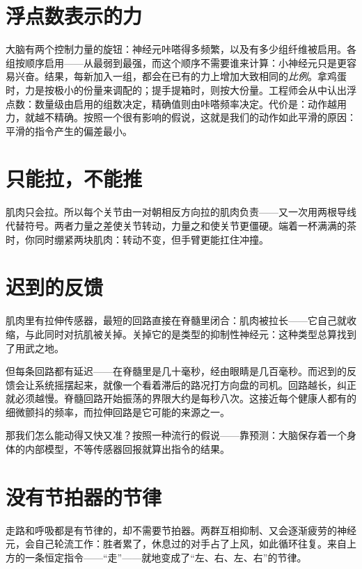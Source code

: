 \section*{浮点数表示的力}

大脑有两个控制力量的旋钮：神经元咔嗒得多频繁，以及有多少组纤维被启用。各组按顺序启用——从最弱到最强，而这个顺序不需要谁来计算：小神经元只是更容易兴奋。结果，每新加入一组，都会在已有的力上增加大致相同的\emph{比例}。拿鸡蛋时，力是按极小的份量来调配的；提手提箱时，则按大份量。工程师会从中认出浮点数：数量级由启用的组数决定，精确值则由咔嗒频率决定。代价是：动作越用力，就越不精确。按照一个很有影响的假说，这就是我们的动作如此平滑的原因：平滑的指令产生的偏差最小。

\section*{只能拉，不能推}

肌肉只会拉。所以每个关节由一对朝相反方向拉的肌肉负责——又一次用两根导线代替符号。两者力量之差使关节转动，力量之和使关节更僵硬。端着一杯满满的茶时，你同时绷紧两块肌肉：转动不变，但手臂更能扛住冲撞。


\section*{迟到的反馈}

肌肉里有拉伸传感器，最短的回路直接在脊髓里闭合：肌肉被拉长——它自己就收缩，与此同时对抗肌被关掉。关掉它的是类型的抑制性神经元：这种类型总算找到了用武之地。

但每条回路都有延迟——在脊髓里是几十毫秒，经由眼睛是几百毫秒。而迟到的反馈会让系统摇摆起来，就像一个看着滞后的路况打方向盘的司机。回路越长，纠正就必须越慢。脊髓回路开始振荡的界限大约是每秒八次。这接近每个健康人都有的细微颤抖的频率，而拉伸回路是它可能的来源之一。

那我们怎么能动得又快又准？按照一种流行的假说——靠预测：大脑保存着一个身体的内部模型，不等传感器回报就算出指令的结果。

\section*{没有节拍器的节律}

走路和呼吸都是有节律的，却不需要节拍器。两群互相抑制、又会逐渐疲劳的神经元，会自己轮流工作：胜者累了，休息过的对手占了上风，如此循环往复。来自上方的一条恒定指令——“走”——就地变成了“左、右、左、右”的节律。

